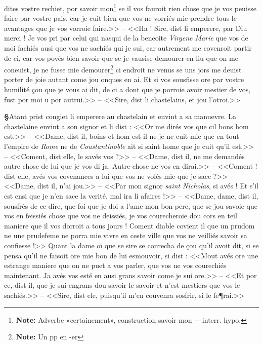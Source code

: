 \documentclass[12pt]{article} %
\newcommand{\colmar}[1]{\marginnote{[#1]}}          %
\newcommand{\persName}[1]{\emph{#1}} %
\newcommand{\placeName}[1]{\emph{#1}} %
\newcommand{\supplied}[1]{\textlangle#1\textrangle} %
\newcommand{\fnnote}[1]{\footnote{\textbf{Note:} #1}} %
\newcounter{paranum}
\newcommand{\pnum}{\stepcounter{paranum}\textbf{§\arabic{paranum}}\quad}
\begin{document}
dites v\supplied{ost}re rechiet, por savoir mon\fnnote{Adverbe «certainement», construction savoir mon + interr. hypo.} se il vos fauroit rien chose que je vos peuisse faire par vostre pais, car je cuit bien que vos ne vorriés mie prendre tous le avantages que je vos vorroie faire.>> -- <<Ha ! Sire, dist li emperere, par Diu merci ! Je vos pri par celui qui nasqui de la beneoite \persName{Virgene Marie} que vos de moi fachiés ausi que vos ne sachiés qui je sui, car autrement me covenroit partir de ci, car vos povés bien savoir que se je vausise demourer en liu que on me coneuist, je ne fusse mie demourer\fnnote{Un pp en -er} ci endroit ne venus se uns jors me deuist porter de joie autant come jou onques en ai. Et si vos sousfisse ore par vostre humilité çou que je vous ai dit, de ci a do\supplied{n}t que je porroie avoir mestier de vos, fust por moi u por autrui.>> -- <<Sire, dist li chastelains, et jou l'otroi.>>

\pnum Atant prist congiet \colmar{10vb}\colmar{b} li emperere au chastelain et envint a sa manuevre. La chastelaine envint a son signor et li dist : <<Or me dirés vos que cil bons hom est.>> -- <<Dame, dist il, boins et hom est il ne je ne cuit mie que en tout l'empire de \placeName{Rome} ne de \placeName{Coustantinoble} ait si saint home que je cuit qu'il est.>> -- <<Coment, dist elle, le savés vos ?>> -- <<Dame, dist il, ne me demandés autre chose de lui que je vos \supplied{di} ja. Autre chose ne vos en dirai.>> -- <<Coment ! dist elle, avés vos covena\supplied{n}ces a lui que vos ne volés mie que je sace ?>> -- <<Dame, dist il, n'ai jou.>> -- <<Par mon signor \persName{saint Nicholas}, si avés ! Et s'il est ensi que je n'en sace la verité, mal ira li afaires !>> -- <<Dame, dame, dist il, sousfrés de ce dire, que foi que je doi a l'ame mon bon pere, que se jou savoie que vos en feissiés chose \supplied{que vos} ne deissiés, je vos courecheroie dou cors en teil maniere que il vos dorroit a tous jours ! Coment diable covient il que un prudom ne une prudefeme ne porra mie vivre en ceste ville que vos ne veilliés savoir sa confiesse !>> Quant la dame oï que se sire se courecha de çou qu'il avoit dit, si se pensa qu'il ne faisoit ore mie bon de lui esmouvoir, si dist : <<Mout avés ore une estrange maniere que on ne puet a vos parler, que vos ne vos courechiés maintenant. Ja avés vos esté en ausi grans savoir come je sui ore.>> -- <<Et por ce, dist il, que je sui engrans dou savoir le savoir et n'est mestiers que vos le sachiés.>> -- <<Sire, dist ele, puisqu'il m'en couvenra sosfrir, si le fe¶rai.>>
\end{document}
